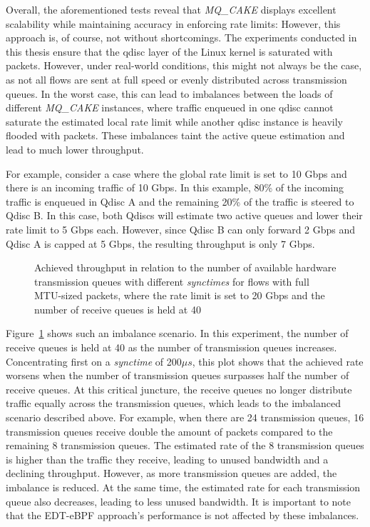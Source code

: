 Overall, the aforementioned tests reveal that \textit{MQ\_CAKE} displays excellent scalability while maintaining accuracy in enforcing rate limits:
%
However, this approach is, of course, not without shortcomings.
%
The experiments conducted in this thesis ensure that the qdisc layer of the Linux kernel is saturated with packets.
%
However, under real-world conditions, this might not always be the case, as not all flows are sent at full speed or evenly distributed across transmission queues.
%
In the worst case, this can lead to imbalances between the loads of different \textit{MQ\_CAKE} instances, where traffic enqueued in one qdisc cannot saturate the estimated local rate limit while another qdisc instance is heavily flooded with packets.
%
These imbalances taint the active queue estimation and lead to much lower throughput.
%

For example, consider a case where the global rate limit is set to 10 Gbps and there is an incoming traffic of 10 Gbps.
%
In this example, 80\% of the incoming traffic is enqueued in Qdisc A and the remaining 20\% of the traffic is steered to Qdisc B. In this case, both Qdiscs will estimate two active queues and lower their rate limit to 5 Gbps each.
However, since Qdisc B can only forward 2 Gbps and Qdisc A is capped at 5 Gbps, the resulting throughput is only 7 Gbps.
%
\begin{figure}[H]
    \centering
    
    \caption{Achieved throughput in relation to the number of available hardware transmission queues with different \textit{synctimes} for flows with full MTU-sized packets, where the rate limit is set to 20 Gbps and the number of receive queues is held at 40}\label{fig:txq_imbalance_1514}
\end{figure}
Figure~\ref{fig:txq_imbalance_1514} shows such an imbalance scenario.
%
In this experiment, the number of receive queues is held at 40 as the number of transmission queues increases.
%
Concentrating first on a \textit{synctime} of 200$\mu s$, this plot shows that the achieved rate worsens when the number of transmission queues surpasses half the number of receive queues.
%
At this critical juncture, the receive queues no longer distribute traffic equally across the transmission queues, which leads to the imbalanced scenario described above.
%
For example, when there are 24 transmission queues, 16 transmission queues receive double the amount of packets compared to the remaining 8 transmission queues.
%
The estimated rate of the 8 transmission queues is higher than the traffic they receive, leading to unused bandwidth and a declining throughput.
%
However, as more transmission queues are added, the imbalance is reduced. At the same time, the estimated rate for each transmission queue also decreases, leading to less unused bandwidth. 
%
It is important to note that the EDT-eBPF approach's performance is not affected by these imbalances.

